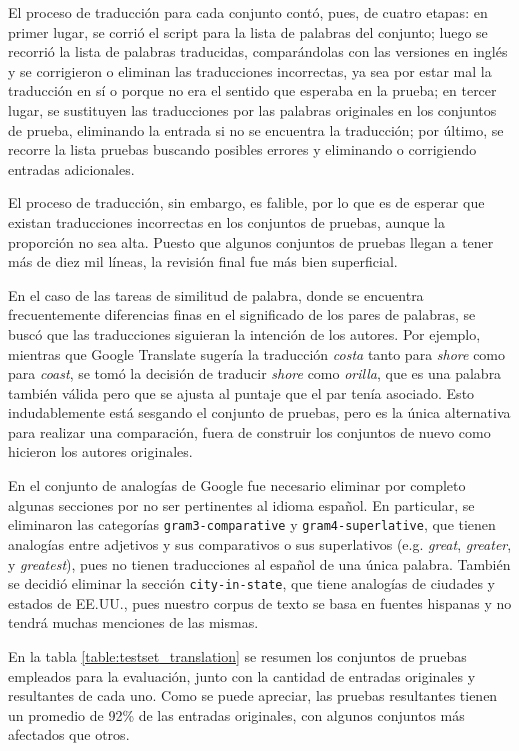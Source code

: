 El proceso de traducción para cada conjunto contó, pues, de cuatro etapas: en primer lugar, se
corrió el script para la lista de palabras del conjunto; luego se recorrió la lista de palabras
traducidas, comparándolas con las versiones en inglés y se corrigieron o eliminan las traducciones
incorrectas, ya sea por estar mal la traducción en sí o porque no era el sentido que esperaba en la
prueba; en tercer lugar, se sustituyen las traducciones por las palabras originales en los conjuntos
de prueba, eliminando la entrada si no se encuentra la traducción; por último, se recorre la lista
pruebas buscando posibles errores y eliminando o corrigiendo entradas adicionales.

El proceso de traducción, sin embargo, es falible, por lo que es de esperar que existan traducciones
incorrectas en los conjuntos de pruebas, aunque la proporción no sea alta. Puesto que algunos
conjuntos de pruebas llegan a tener más de diez mil líneas, la revisión final fue más bien
superficial.

En el caso de las tareas de similitud de palabra, donde se encuentra frecuentemente diferencias
finas en el significado de los pares de palabras, se buscó que las traducciones siguieran la
intención de los autores. Por ejemplo, mientras que Google Translate sugería la traducción
\textit{costa} tanto para \textit{shore} como para \textit{coast}, se tomó la decisión de traducir
\textit{shore} como \textit{orilla}, que es una palabra también válida pero que se ajusta al puntaje
que el par tenía asociado. Esto indudablemente está sesgando el conjunto de pruebas, pero es la
única alternativa para realizar una comparación, fuera de construir los conjuntos de nuevo como
hicieron los autores originales.

En el conjunto de analogías de Google fue necesario eliminar por completo algunas secciones por no
ser pertinentes al idioma español. En particular, se eliminaron las categorías
\texttt{gram3-comparative} y \texttt{gram4-superlative}, que tienen analogías entre adjetivos y sus
comparativos o sus superlativos (e.g. \textit{great}, \textit{greater}, y \textit{greatest}), pues
no tienen traducciones al español de una única palabra. También se decidió eliminar la sección
\texttt{city-in-state}, que tiene analogías de ciudades y estados de EE.UU., pues nuestro corpus de
texto se basa en fuentes hispanas y no tendrá muchas menciones de las mismas.

En la tabla \ref{table:testset_translation} se resumen los conjuntos de pruebas empleados para la
evaluación, junto con la cantidad de entradas originales y resultantes de cada uno. Como se puede
apreciar, las pruebas resultantes tienen un promedio de 92\% de las entradas originales,
con algunos conjuntos más afectados que otros.

